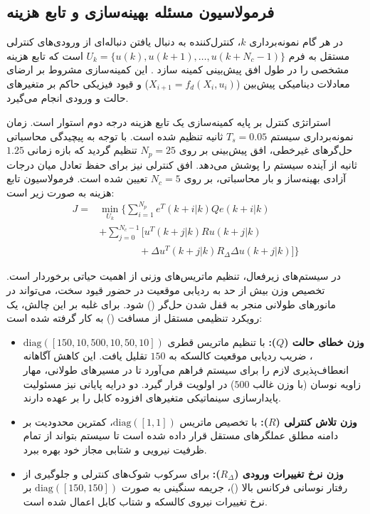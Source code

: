 \subsection{فرمولاسیون مسئله بهینه‌سازی و تابع هزینه}
در هر گام نمونه‌برداری $k$، کنترل‌کننده  به دنبال یافتن دنباله‌ای از ورودی‌های کنترلی مستقل به فرم $U_k = \{u(k), u(k+1), \dots, u(k+N_c-1)\}$ است که تابع هزینه مشخصی را در طول افق پیش‌بینی کمینه سازد \cite{Zak2017Introduction}. این کمینه‌سازی مشروط بر ارضای معادلات دینامیکی پیش‌بین ($X_{i+1} = f_d(X_i, u_i)$) و قیود فیزیکی حاکم بر متغیرهای حالت و ورودی انجام می‌گیرد.

استراتژی کنترل بر پایه کمینه‌سازی یک تابع هزینه درجه دوم استوار است. زمان نمونه‌برداری سیستم $T_s = 0.05$ ثانیه تنظیم شده است. با توجه به پیچیدگی محاسباتی حل‌گرهای غیرخطی، افق پیش‌بینی بر روی $N_p = 25$ تنظیم گردید که بازه زمانی $1.25$ ثانیه از آینده سیستم را پوشش می‌دهد. افق کنترلی نیز برای حفظ تعادل میان درجات آزادی بهینه‌ساز و بار محاسباتی، بر روی $N_c = 5$ تعیین شده است. فرمولاسیون تابع هزینه به صورت زیر است:
\begin{equation}
    \begin{split}
        J = & \min_{U_k} \Bigg\{ \sum_{i=1}^{N_p} e^T(k+i|k) Q e(k+i|k)                 \\
            & + \sum_{j=0}^{N_c-1} \Big[ u^T(k+j|k) R u(k+j|k)                          \\
            & \qquad\qquad + \Delta u^T(k+j|k) R_{\Delta} \Delta u(k+j|k) \Big] \Bigg\}
    \end{split}
\end{equation}

در سیستم‌های زیرفعال، تنظیم ماتریس‌های وزنی از اهمیت حیاتی برخوردار است. تخصیص وزن بیش از حد به ردیابی موقعیت در حضور قیود سخت، می‌تواند در مانورهای طولانی منجر به قفل شدن حل‌گر () شود. برای غلبه بر این چالش، یک رویکرد تنظیمی مستقل از مسافت () به کار گرفته شده است:
\begin{itemize}
    \item \textbf{وزن خطای حالت ($Q$):} با تنظیم ماتریس قطری $\text{diag}([150, 10, 500, 10, 50, 10])$، ضریب ردیابی موقعیت کالسکه به $150$ تقلیل یافت. این کاهش آگاهانه انعطاف‌پذیری لازم را برای سیستم فراهم می‌آورد تا در مسیرهای طولانی، مهار زاویه نوسان (با وزن غالب $500$) در اولویت قرار گیرد. دو درایه پایانی نیز مسئولیت پایدارسازی سینماتیکی متغیرهای افزوده کابل را بر عهده دارند.
    \item \textbf{وزن تلاش کنترلی ($R$):} با تخصیص ماتریس $\text{diag}([1, 1])$، کمترین محدودیت بر دامنه مطلق عملگرهای مستقل قرار داده شده است تا سیستم بتواند از تمام ظرفیت نیرویی و شتابی مجاز خود بهره ببرد.
    \item \textbf{وزن نرخ تغییرات ورودی ($R_{\Delta}$):} برای سرکوب شوک‌های کنترلی و جلوگیری از رفتار نوسانی فرکانس بالا ()، جریمه سنگینی به صورت $\text{diag}([150, 150])$ بر نرخ تغییرات نیروی کالسکه و شتاب کابل اعمال شده است.
\end{itemize}

